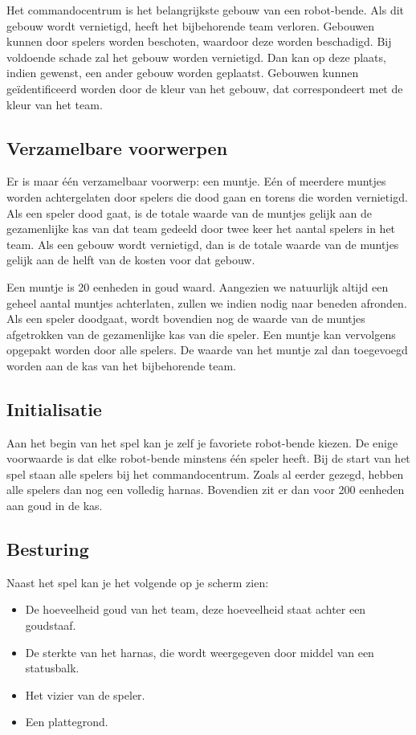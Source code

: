     Het commandocentrum is het belangrijkste gebouw van een robot-bende. Als dit gebouw wordt vernietigd, heeft het bijbehorende team verloren. Gebouwen kunnen door spelers worden beschoten, waardoor deze worden beschadigd. Bij voldoende schade zal het gebouw worden vernietigd. Dan kan op deze plaats, indien gewenst, een ander gebouw worden geplaatst. Gebouwen kunnen ge\"identificeerd worden door de kleur van het gebouw, dat correspondeert met de kleur van het team.

    \subsection{Verzamelbare voorwerpen}
    Er is maar \'e\'en verzamelbaar voorwerp: een muntje. E\'en of meerdere muntjes worden achtergelaten door spelers die dood gaan en torens die worden vernietigd. Als een speler dood gaat, is de totale waarde van de muntjes gelijk aan de gezamenlijke kas van dat team gedeeld door twee keer het aantal spelers in het team. Als een gebouw wordt vernietigd, dan is de totale waarde van de muntjes gelijk aan de helft van de kosten voor dat gebouw.

    Een muntje is 20 eenheden in goud waard. Aangezien we natuurlijk altijd een geheel aantal muntjes achterlaten, zullen we indien nodig naar beneden afronden. Als een speler doodgaat, wordt bovendien nog de waarde van de muntjes afgetrokken van de gezamenlijke kas van die speler. Een muntje kan vervolgens opgepakt worden door alle spelers. De waarde van het muntje zal dan toegevoegd worden aan de kas van het bijbehorende team.

    \subsection{Initialisatie}
    Aan het begin van het spel kan je zelf je favoriete robot-bende kiezen. De enige voorwaarde is dat elke robot-bende minstens \'e\'en speler heeft. Bij de start van het spel staan alle spelers bij het commandocentrum. Zoals al eerder gezegd, hebben alle spelers dan nog een volledig harnas. Bovendien zit er dan voor 200 eenheden aan goud in de kas.
    \FloatBarrier

    \subsection{Besturing}
    \label{sec:UI}

    Naast het spel kan je het volgende op je scherm zien:
    \begin{itemize}
    \item De hoeveelheid goud van het team, deze hoeveelheid staat achter een goudstaaf.
    \item De sterkte van het harnas, die wordt weergegeven door middel van een statusbalk.
    \item Het vizier van de speler.
    \item Een plattegrond.
    \end{itemize}


